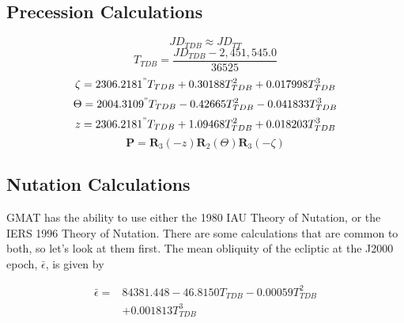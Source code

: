 \subsection{Precession Calculations} \label{Sec:PrecessionTheory}

\begin{equation}
   JD_{TDB} \approx JD_{TT}
\end{equation}
%
\begin{equation}
   T_{TDB} = \frac{JD_{TDB} - 2,451,545.0}{36525}
\end{equation}
%
\begin{equation}
    \zeta = 2306.2181^{"} T_{TDB} +0.30188 T_{TDB}^2 + 0.017998
    T_{TDB}^3
\end{equation}
%
\begin{equation}
    \Theta = 2004.3109^{"} T_{TDB} -0.42665 T_{TDB}^2 - 0.041833
    T_{TDB}^3
\end{equation}
%
\begin{equation}
    z = 2306.2181^{"}T_{TDB} + 1.09468 T_{TDB}^2 + 0.018203
    T_{TDB}^3
\end{equation}
%
\begin{equation}
     \mathbf{P} =
     \mathbf{R}_3(-z)\mathbf{R}_2(\Theta)\mathbf{R}_3(-\zeta)
\end{equation}

\subsection{Nutation Calculations}  \label{Sec:NutationTheory}

GMAT has the ability to use either the 1980 IAU Theory of Nutation,
or the IERS 1996 Theory of Nutation.  There are some calculations
that are common to both, so let's look at them first.  The mean
obliquity of the ecliptic at the J2000 epoch, $\bar{\epsilon}$, is
given by

\begin{equation}
    \begin{split}
    \bar{\epsilon} = & 84381.448 - 46.8150T_{TDB} - 0.00059T_{TDB}^2 \\ & +
    0.001813T_{TDB}^3
    \end{split}
\end{equation}

